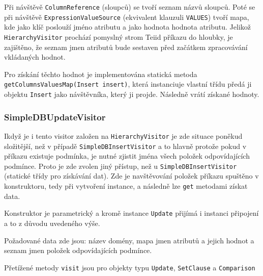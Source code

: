 \documentclass[oneside,12pt,final]{fithesis2}
\begin{document}
Při návštěvě \texttt{ColumnReference} (sloupců) se tvoří seznam názvů sloupců. Poté se při návštěvě \texttt{ExpressionValueSource} (ekvivalent klauzuli \texttt{VALUES}) tvoří mapa, kde jako klíč poslouží jméno atributu a jako hodnota hodnota atributu. Jelikož \texttt{HierarchyVisitor} prochází pomyslný strom Teiid příkazu do hloubky, je zajištěno, že seznam jmen atributů bude sestaven před začátkem zpracovávání vkládaných hodnot.

Pro získání těchto hodnot je implementována statická metoda \texttt{getColumns\allowbreak ValuesMap(Insert insert)}, která instanciuje vlastní třídu předá ji objektu \texttt{Insert} jako návštěvníka, který ji projde. Následně vrátí získané hodnoty.

\subsubsection{SimpleDBUpdateVisitor}
Ikdyž je i tento visitor založen na \texttt{HierarchyVisitor} je zde situace poněkud složitější, než v případě \texttt{SimpleDBInsertVisitor} a to hlavně protože pokud v příkazu existuje podmínka, je nutné zjistit jména všech položek odpovídajících podmínce. Proto je zde zvolen jiný přístup, než u \texttt{SimpleDBInsertVisitor} (statické třídy pro získávání dat). Zde je navštěvování položek příkazu spuštěno v konstruktoru, tedy při vytvoření instance, a následně lze \texttt{get} metodami získat  data.

Konstruktor je parametrický a kromě instance \texttt{Update} přijímá i instanci připojení a to z důvodu uvedeného výše.

Požadované data zde jsou: název domény, mapa jmen atributů a jejich hodnot a seznam jmen položek odpovídajících podmínce.

Přetížené metody \texttt{visit} jsou pro objekty typu \texttt{Update}, \texttt{SetClause} a \texttt{Comparison}
\end{document}
